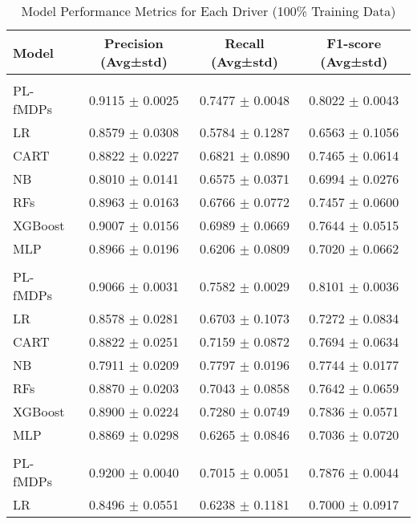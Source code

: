 \begin{table}[htbp]
\centering
\caption{Model Performance Metrics for Each Driver (100\% Training Data)}
\label{tab:driver_metrics}
\begin{tabular}{|l|ccc|}
\hline
\textbf{Model} & \textbf{Precision (Avg±std)} & \textbf{Recall (Avg±std)} & \textbf{F1-score (Avg±std)} \\
\hline
\vspace{2mm}
\multicolumn{4}{|c|}{\textbf{Driver 1}} \\
\hline
PL-fMDPs & 0.9115 $\pm$ 0.0025 & 0.7477 $\pm$ 0.0048 & 0.8022 $\pm$ 0.0043 \\
LR & 0.8579 $\pm$ 0.0308 & 0.5784 $\pm$ 0.1287 & 0.6563 $\pm$ 0.1056 \\
CART & 0.8822 $\pm$ 0.0227 & 0.6821 $\pm$ 0.0890 & 0.7465 $\pm$ 0.0614 \\
NB & 0.8010 $\pm$ 0.0141 & 0.6575 $\pm$ 0.0371 & 0.6994 $\pm$ 0.0276 \\
RFs & 0.8963 $\pm$ 0.0163 & 0.6766 $\pm$ 0.0772 & 0.7457 $\pm$ 0.0600 \\
XGBoost & 0.9007 $\pm$ 0.0156 & 0.6989 $\pm$ 0.0669 & 0.7644 $\pm$ 0.0515 \\
MLP & 0.8966 $\pm$ 0.0196 & 0.6206 $\pm$ 0.0809 & 0.7020 $\pm$ 0.0662 \\
\midrule
\vspace{2mm}
\multicolumn{4}{|c|}{\textbf{Driver 2}} \\
\hline
PL-fMDPs & 0.9066 $\pm$ 0.0031 & 0.7582 $\pm$ 0.0029 & 0.8101 $\pm$ 0.0036 \\
LR & 0.8578 $\pm$ 0.0281 & 0.6703 $\pm$ 0.1073 & 0.7272 $\pm$ 0.0834 \\
CART & 0.8822 $\pm$ 0.0251 & 0.7159 $\pm$ 0.0872 & 0.7694 $\pm$ 0.0634 \\
NB & 0.7911 $\pm$ 0.0209 & 0.7797 $\pm$ 0.0196 & 0.7744 $\pm$ 0.0177 \\
RFs & 0.8870 $\pm$ 0.0203 & 0.7043 $\pm$ 0.0858 & 0.7642 $\pm$ 0.0659 \\
XGBoost & 0.8900 $\pm$ 0.0224 & 0.7280 $\pm$ 0.0749 & 0.7836 $\pm$ 0.0571 \\
MLP & 0.8869 $\pm$ 0.0298 & 0.6265 $\pm$ 0.0846 & 0.7036 $\pm$ 0.0720 \\
\midrule
\vspace{2mm}
\multicolumn{4}{|c|}{\textbf{Driver 3}} \\
\hline
PL-fMDPs & 0.9200 $\pm$ 0.0040 & 0.7015 $\pm$ 0.0051 & 0.7876 $\pm$ 0.0044 \\
LR & 0.8496 $\pm$ 0.0551 & 0.6238 $\pm$ 0.1181 & 0.7000 $\pm$ 0.0917 \\

\end{tabular}
\end{table}
